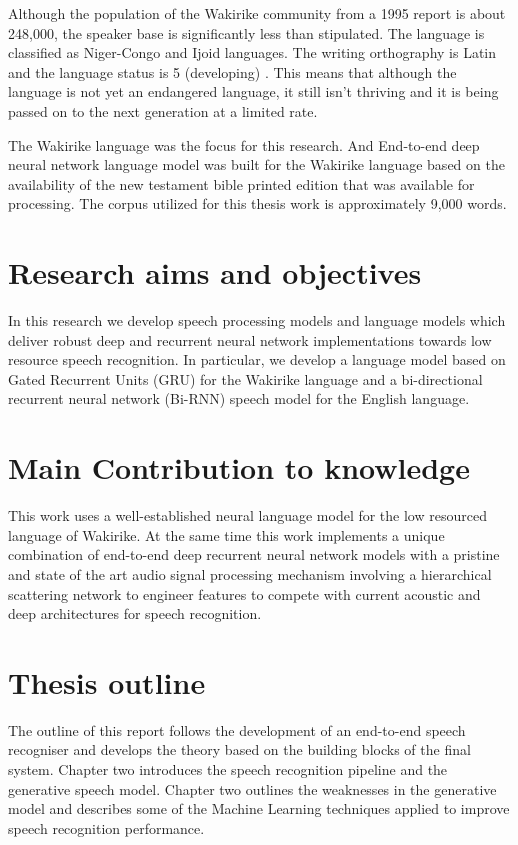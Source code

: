 Although the population of the Wakirike community from a 1995 report \citep{ethnologue} is about 248,000, the speaker base is  significantly less than stipulated.  The language is classified as Niger-Congo and Ijoid languages.  The writing orthography is Latin and the language status is 5 (developing) \citep{ethnologue}.  This means that although the language is not yet an endangered language, it still isn't thriving and it is being passed on to the next generation at a limited rate.

The Wakirike language was the focus for this research.  And End-to-end deep neural network language model was built for the Wakirike language based on the availability of the new testament bible printed edition that was available for processing.  The corpus utilized for this thesis work is approximately 9,000 words.

\section{Research aims and objectives}
In this research we develop speech processing models and language models which deliver robust deep and recurrent neural network implementations towards low resource speech recognition.  In particular, we develop a language model based on Gated Recurrent Units (GRU) for the Wakirike language and a bi-directional recurrent neural network (Bi-RNN) speech model for the English language. 

\section{Main Contribution to knowledge}

This work uses a well-established neural language model for the low resourced language of Wakirike.  At the same time this work implements a unique combination of end-to-end deep recurrent neural network models with a pristine and state of the art audio signal processing mechanism involving a hierarchical scattering network to engineer features to compete with current acoustic and deep architectures for speech recognition.

\section{Thesis outline}
The outline of this report follows the development of an end-to-end speech recogniser and develops the theory based on the building blocks of the final system.  Chapter two introduces the speech recognition pipeline and the generative speech model.  Chapter two outlines the weaknesses in the generative model and describes some of the Machine Learning techniques applied to improve speech recognition performance. 

